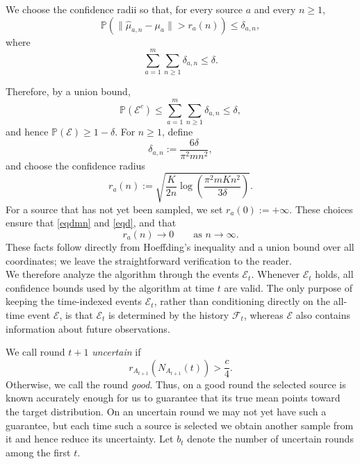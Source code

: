 \documentclass[twoside]{article}
\begin{document}
We choose the confidence radii so that, for every source \(a\) and every
\(n\ge1\),
\begin{equation}
\label{eqdmn}    \mathbb P\left(
    \|\widehat\mu_{a,n}-\mu_a\|>r_a(n)
\right)
\le
\delta_{a,n},
\end{equation}
where
\begin{equation}
\label{eqd}
\sum_{a=1}^m\sum_{n\ge1}\delta_{a,n}\le\delta.
\end{equation}

Therefore, by a union bound,
\[
\mathbb P(\mathcal E^c)
\le
\sum_{a=1}^m\sum_{n\ge1}\delta_{a,n}
\le
\delta,
\]
and hence $
\mathbb P(\mathcal E)\ge1-\delta.
$
For \(n\ge1\), define
\[
    \delta_{a,n}
    :=
    \frac{6\delta}{\pi^2 m n^2},
\]
and choose the confidence radius
\[
    r_a(n)
    :=
    \sqrt{
        \frac{K}{2n}
        \log\left(
            \frac{\pi^2 m K n^2}{3\delta}
        \right)
    }.
\]
For a source that has not yet been sampled, we set $  r_a(0):=+\infty.$ These choices ensure that \eqref{eqdmn} and \eqref{eqd},
and that
\[
    r_a(n)\longrightarrow0
    \qquad\text{as }n\to\infty.
\]
These facts follow directly from Hoeffding's inequality and a union bound
over all coordinates; we leave the straightforward verification to the
reader.\\

We therefore analyze the algorithm through the events \(\mathcal E_t\).
Whenever \(\mathcal E_t\) holds, all confidence bounds used by the algorithm
at time \(t\) are valid. The only purpose of keeping the time-indexed events
\(\mathcal E_t\), rather than conditioning directly on the all-time event
\(\mathcal E\), is that \(\mathcal E_t\) is determined by the history
\(\mathcal F_t\), whereas \(\mathcal E\) also contains information about
future observations.

    


We call round \(t+1\) \emph{uncertain} if
\[
    r_{A_{t+1}}\!\left(N_{A_{t+1}}(t)\right)
    >
    \frac{c}{4}.
\]
Otherwise, we call the round \emph{good}. Thus, on a good round the selected
source is known accurately enough for us to guarantee that its true mean points
toward the target distribution. On an uncertain round we may not yet have such
a guarantee, but each time such a source is selected we obtain another sample
from it and hence reduce its uncertainty.
Let \(b_t\) denote the number of uncertain rounds among the first \(t\).
\end{document}
